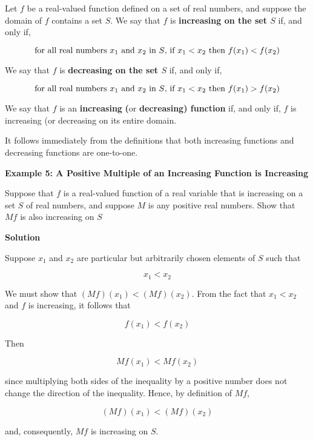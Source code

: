\vskip 1mm Let $f$ be a real-valued function defined on a set of real numbers, and suppose the domain of $f$ contains a set $S$. We say that $f$ is {\bf increasing on the set $S$} if, and only if,

$$\hbox{for all real numbers $x_1$ and $x_2$ in $S$, if $x_1<x_2$ then $f(x_1)<f(x_2)$}$$

We say that $f$ is {\bf decreasing on the set $S$} if, and only if,

$$\hbox{for all real numbers $x_1$ and $x_2$ in $S$, if $x_1<x_2$ then $f(x_1)>f(x_2)$}$$

We say that $f$ is an {\bf increasing} {\bf(}or {\bf decreasing) function} if, and only if, $f$ is increasing (or decreasing on its entire domain.

\vskip 1mm
It follows immediately from the definitions that both increasing functions and decreasing functions are one-to-one.


\filbreak
\vskip 1cm
{\bf Example 5: A Positive Multiple of an Increasing Function is Increasing}

\vskip 1mm
Suppose that $f$ is a real-valued function of a real variable that is increasing on a set $S$ of real numbers, and suppose $M$ is any positive real numbers. Show that $Mf$ is also increasing on $S$

\vskip 3mm
{\bf Solution}

\vskip 1mm
Suppose $x_1$ and $x_2$ are particular but arbitrarily chosen elements of $S$ such that

$$x_1<x_2$$

We must show that $(Mf)(x_1)<(Mf)(x_2)$. From the fact that $x_1<x_2$ and $f$ is increasing, it follows that

$$f(x_1)<f(x_2)$$

Then

$$Mf(x_1)<Mf(x_2)$$

since multiplying both sides of the inequality by a positive number does not change the direction of the inequality. Hence, by definition of $Mf$,

$$(Mf)(x_1)<(Mf)(x_2)$$

and, consequently, $Mf$ is increasing on $S$.

\filbreak
\vfill\eject
\bye
